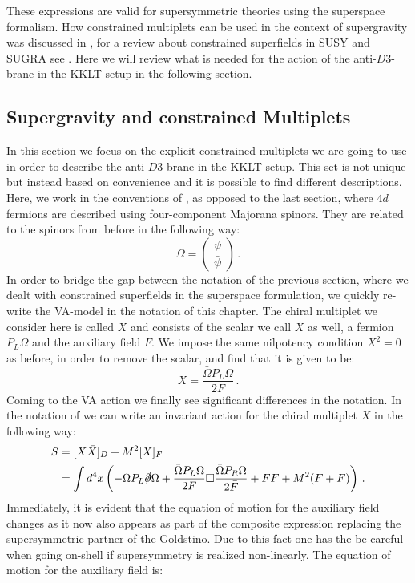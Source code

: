 \documentclass[a4paper,12pt,twoside,openright]{report}
\newcommand{\be}{\begin{equation}}
\newcommand{\ee}{\end{equation}}
\newcommand{\bea}{\begin{equation}\begin{aligned}}
\newcommand{\eea}{\end{aligned}\end{equation}}
\begin{document}
These expressions are valid for supersymmetric theories using the superspace formalism. How constrained multiplets can be used in the context of supergravity was discussed in \cite{DallAgata:2015zxp}, for a review about constrained superfields in SUSY and SUGRA see \cite{Cribiori:2018hxv}. Here we will review what is needed for the action of the anti-$D3$-brane in the KKLT setup in the following section.

\subsection{Supergravity and constrained Multiplets}%
In this section we focus on the explicit constrained multiplets we are going to use in order to describe the anti-$D3$-brane in the KKLT setup. This set is not unique but instead based on convenience and it is possible to find different descriptions. Here, we work in the conventions of \cite{Freedman:2012zz}, as opposed to the last section, where $4d$ fermions are described using four-component Majorana spinors. They are related to the spinors from before in the following way:
\be 
\Omega = \begin{pmatrix} \psi \\ \bar{\psi}\end{pmatrix}\,.
\ee
In order to bridge the gap between the notation of the previous section, where we dealt with constrained superfields in the superspace formulation, we quickly re-write the VA-model in the notation of this chapter. The chiral multiplet we consider here is called $X$ and consists of the scalar we call $X$ as well, a fermion $P_L \Omega$ and the auxiliary field $F$. We impose the same nilpotency condition $X^2=0$ as before, in order to remove the scalar, and find that it is given to be:
\be 
X = \frac{\bar{\Omega} P_L \Omega}{2F}\,.
\ee
Coming to the VA action we finally see significant differences in the notation. In the notation of \cite{Freedman:2012zz} we can write an invariant action for the chiral multiplet $X$ in the following way:
\bea 
S &= [X\bar{X}]_D + M^2 [X]_F\\
  &= \int d^4 x \left( - \bar{\Omega} P_L \slashed{\partial}\Omega + \frac{\bar{\Omega}P_L\Omega}{2F} \square \frac{\bar{\Omega}P_R\Omega}{2\bar{F}} + F \bar{F} + M^2 (F+\bar{F})\right)\,.
\label{eq:VAsusy}
\eea
Immediately, it is evident that the equation of motion for the auxiliary field changes as it now also appears as part of the composite expression replacing the supersymmetric partner of the Goldstino. Due to this fact one has the be careful when going on-shell if supersymmetry is realized non-linearly. The equation of motion for the auxiliary field is:
\end{document}
